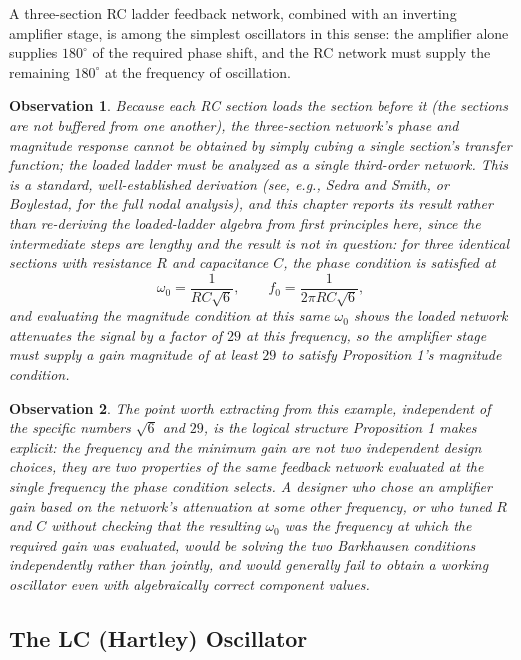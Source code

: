 \documentclass[12pt]{article}
\newtheorem{observation}{Observation}
\begin{document}
A three-section RC ladder feedback network, combined with an inverting amplifier stage, is among the simplest oscillators in this sense: the amplifier alone supplies $180^\circ$ of the required phase shift, and the RC network must supply the remaining $180^\circ$ at the frequency of oscillation.

\begin{observation}
Because each RC section loads the section before it (the sections are not buffered from one another), the three-section network's phase and magnitude response cannot be obtained by simply cubing a single section's transfer function; the loaded ladder must be analyzed as a single third-order network. This is a standard, well-established derivation (see, e.g., Sedra and Smith, or Boylestad, for the full nodal analysis), and this chapter reports its result rather than re-deriving the loaded-ladder algebra from first principles here, since the intermediate steps are lengthy and the result is not in question: for three identical sections with resistance $R$ and capacitance $C$, the phase condition is satisfied at
\[
\omega_0 = \frac{1}{RC\sqrt{6}}, \qquad f_0 = \frac{1}{2\pi RC\sqrt{6}},
\]
and evaluating the magnitude condition at this same $\omega_0$ shows the loaded network attenuates the signal by a factor of $29$ at this frequency, so the amplifier stage must supply a gain magnitude of at least $29$ to satisfy Proposition 1's magnitude condition.
\end{observation}

\begin{observation}
The point worth extracting from this example, independent of the specific numbers $\sqrt{6}$ and $29$, is the logical structure Proposition 1 makes explicit: the frequency and the minimum gain are not two independent design choices, they are two properties of the same feedback network evaluated at the single frequency the phase condition selects. A designer who chose an amplifier gain based on the network's attenuation at some other frequency, or who tuned $R$ and $C$ without checking that the resulting $\omega_0$ was the frequency at which the required gain was evaluated, would be solving the two Barkhausen conditions independently rather than jointly, and would generally fail to obtain a working oscillator even with algebraically correct component values.
\end{observation}

\subsection{The LC (Hartley) Oscillator}
\end{document}
